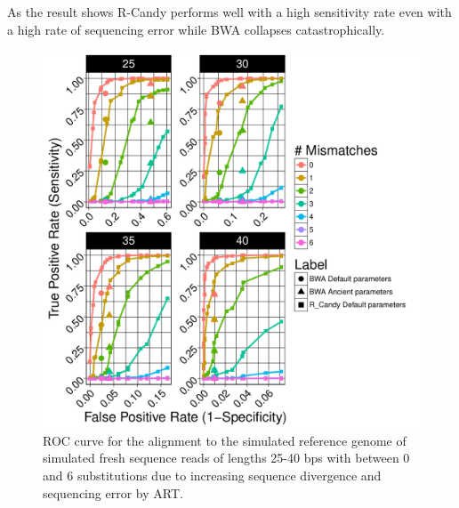 \documentclass[11pt,a4paper]{report}
\begin{document}
As the result shows R-Candy performs well with a high sensitivity rate 
even with a high rate of sequencing error while BWA collapses catastrophically.\\

\begin{figure}[H]
\centering
\includegraphics[width=12cm]{pictures/bROC_DS3_ART.pdf}
\caption{
ROC curve for the alignment to the simulated reference genome of simulated fresh 
sequence reads of lengths 25-40 bps with between 0 and 6 substitutions due 
to increasing sequence divergence and sequencing error by ART.}
\label{DS3_ART}
\end{figure}
\end{document}
